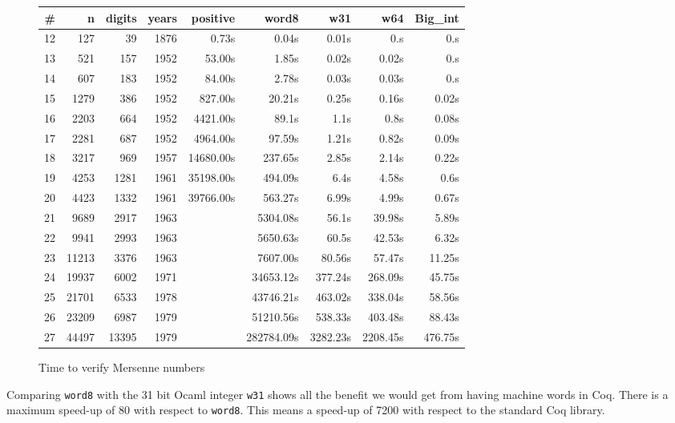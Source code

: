 \begin{figure}
\begin{center}
\begin{tabular}{|r|r|r|r|r|r|r|r|r |}
\hline
\# & n & digits & years &  positive & word8 & w31 & w64 & Big\_int\\
\hline
12 &  127 &  39 & 1876 &  0.73s & 0.04s & 0.01s & 0.s & 0.s \\
13 &  521 & 157 & 1952 &  53.00s & 1.85s & 0.02s & 0.02s &  0.s\\
14 &  607 & 183 & 1952 &  84.00s & 2.78s & 0.03s & 0.03s &  0.s\\
15 & 1279 & 386 & 1952 &  827.00s & 20.21s& 0.25s & 0.16s &  0.02s\\
16 & 2203 & 664 & 1952 &  4421.00s & 89.1s & 1.1s & 0.8s &  0.08s\\
17 & 2281 & 687 & 1952 &  4964.00s & 97.59s & 1.21s & 0.82s &  0.09s\\
18 & 3217 & 969 & 1957 &  14680.00s & 237.65s & 2.85s & 2.14s &  0.22s\\
19 & 4253 & 1281 & 1961 &35198.00s & 494.09s& 6.4s & 4.58s &  0.6s\\
20 & 4423 & 1332 & 1961 &  39766.00s & 563.27s & 6.99s & 4.99s &  0.67s\\
21 & 9689 & 2917  & 1963 &   & 5304.08s & 56.1s & 39.98s &  5.89s\\	 
22 & 9941 & 2993  & 1963 &   & 5650.63s & 60.5s & 42.53s &  6.32s\\	 
23 & 11213 & 3376 & 1963 &    & 7607.00s & 80.56s & 57.47s &  11.25s\\ 
24 & 19937 & 6002  & 1971 &  & 34653.12s & 377.24s & 268.09s &  45.75s\\
25 & 21701 & 6533 & 1978 &  &43746.21s & 463.02s & 338.04s &  58.56s \\
26 & 23209 & 6987 & 1979  &  &51210.56s & 538.33s & 403.48s &  88.43s\\
27 & 44497 & 13395 & 1979  &  &282784.09s & 3282.23s & 2208.45s &  476.75s \\
\hline

\end{tabular}
\end{center}
\caption{Time to verify Mersenne numbers}
\label{fig:Mersenne}
\end{figure}

Comparing {\tt word8} with the 31 bit {\sc Ocaml} integer {\tt w31} shows all the benefit we would
get from having machine words in {\sc Coq}. There is a maximum speed-up of 80 with respect to {\tt word8}. This
means a speed-up of 7200 with respect to the standard {\sc Coq} library.

